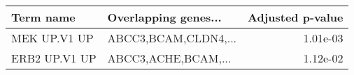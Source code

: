 \begin{tabular}{llr}
\toprule
    Term name & Overlapping genes... &  Adjusted p-value \\
\midrule
 MEK UP.V1 UP & ABCC3,BCAM,CLDN4,... &          1.01e-03 \\
ERB2 UP.V1 UP &  ABCC3,ACHE,BCAM,... &          1.12e-02 \\
\bottomrule
\end{tabular}
